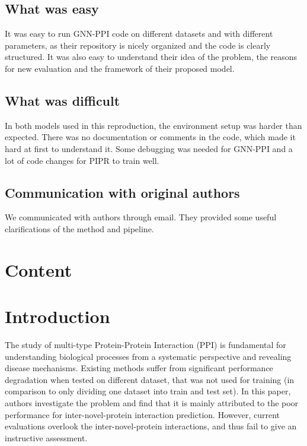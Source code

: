\subsection*{What was easy}

It was easy to run GNN-PPI code on different datasets and with different parameters, as their repository is nicely organized and the code is clearly structured. It was also easy to understand their idea of the problem, the reasons for new evaluation and the framework of their proposed model.

\subsection*{What was difficult}

In both models used in this reproduction, the environment setup was harder than expected. There was no documentation or comments in the code, which made it hard at first to understand it. Some debugging was needed for GNN-PPI and a lot of code changes for PIPR to train well.



\subsection*{Communication with original authors}

We communicated with authors through email. They provided some useful clarifications of the method and pipeline.

\clearpage

\section{Content}

\section{Introduction}
The study of multi-type Protein-Protein Interaction (PPI) is fundamental for understanding biological processes from a systematic perspective and revealing disease mechanisms. Existing methods suffer from significant performance degradation when tested on different dataset, that was not used for training (in comparison to only dividing one dataset into train and test set). In this paper, authors investigate the problem and find that it is mainly attributed to the poor performance for inter-novel-protein interaction prediction. However, current evaluations overlook the inter-novel-protein interactions, and thus fail to give an instructive assessment. 

